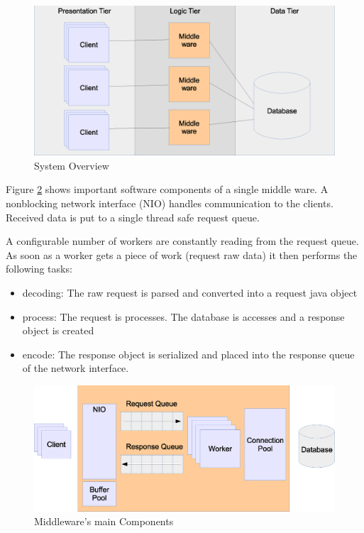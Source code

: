 \documentclass[a4paper]{article}
\begin{document}

\begin{figure}
  \begin{center}
    \includegraphics[scale=0.4]{../drawings/system-overview.eps}
  \end{center}
  \caption{System Overview}
  \label{fig:system-overview}
\end{figure}

Figure \ref{fig:middleware-threading} shows important software components of a single middle ware. A nonblocking network interface (NIO) handles communication to the clients. Received data is put to a single thread safe request queue.

A configurable number of workers are constantly reading from the request queue. As soon as a worker gets a piece of work (request raw data) it then performs the following tasks:
\begin{itemize}
\item decoding: The raw request is parsed and converted into a request java object
\item process: The request is processes. The database is accesses and a response object is created
\item encode: The response object is serialized and placed into the response queue of the network interface.
\end{itemize}


\begin{figure}
	\begin{center}
    \includegraphics[scale=0.4]{../drawings/broker-threading.eps}
  \end{center}
  \caption{Middleware's main Components}
  \label{fig:middleware-threading}
\end{figure}
\end{document}
